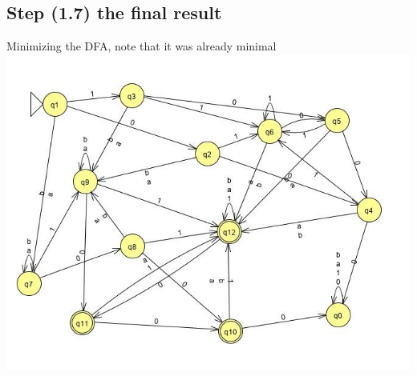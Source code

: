 \documentclass{article}
\theoremstyle{remark}
\numberwithin{equation}{section}
\begin{document}
	\subsection*{Step (1.7) the final result}
	Minimizing the DFA, note that it was already minimal \\
	\includegraphics[width=\columnwidth]{E_MincDFATV.jpg}\\
\end{document}
